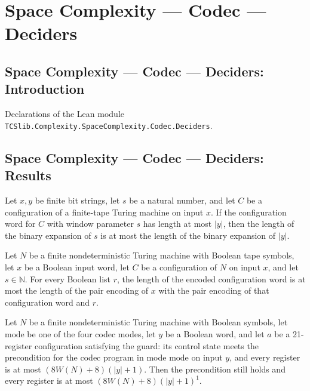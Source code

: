 \section{Space Complexity --- Codec --- Deciders}
\subsection*{Space Complexity --- Codec --- Deciders: Introduction}

Declarations of the Lean module \texttt{TCSlib.Complexity.SpaceComplexity.Codec.Deciders}.

\subsection*{Space Complexity --- Codec --- Deciders: Results}

\begin{lemma}
\label{Complexity.Codec.width_of_code}
\leanok
{}
Let $x,y$ be finite bit strings, let $s$ be a natural number, and let $C$ be a
configuration of a finite-tape Turing machine on input $x$. If the configuration word
for $C$ with window parameter $s$ has length at most $|y|$, then the length of the
binary expansion of $s$ is at most the length of the binary expansion of $|y|$.
\end{lemma}

\begin{lemma}
\label{Complexity.Codec.cfgWord_le_length}
\leanok
{}
Let $N$ be a finite nondeterministic Turing machine with Boolean tape symbols, let $x$
be a Boolean input word, let $C$ be a configuration of $N$ on input $x$, and let
$s\in\mathbb{N}$. For every Boolean list $r$, the length of the encoded configuration
word is at most the length of the pair encoding of $x$ with the pair encoding of that
configuration word and $r$.
\end{lemma}

\begin{lemma}
\label{Complexity.Codec.gd_mono}
\leanok
{}
Let $N$ be a finite nondeterministic Turing machine with Boolean symbols, let
$\mathrm{mode}$ be one of the four codec modes, let $y$ be a Boolean word, and let $a$
be a 21-register configuration satisfying the guard: its control state meets the
precondition for the codec program in mode $\mathrm{mode}$ on input $y$, and every
register is at most $(8W(N)+8)(|y|+1)$. Then the precondition still holds and every
register is at most $(8W(N)+8)(|y|+1)^1$.
\end{lemma}

